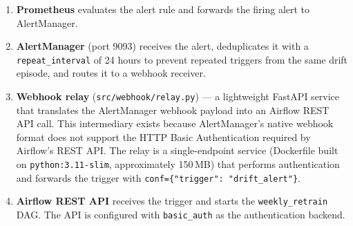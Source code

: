 \begin{enumerate}
    \item \textbf{Prometheus} evaluates the alert rule and forwards the
          firing alert to AlertManager.
    \item \textbf{AlertManager} (port 9093) receives the alert, deduplicates
          it with a \texttt{repeat\_interval} of 24 hours to prevent
          repeated triggers from the same drift episode, and routes it to
          a webhook receiver.
    \item \textbf{Webhook relay} (\texttt{src/webhook/relay.py}) --- a
          lightweight FastAPI service that translates the AlertManager
          webhook payload into an Airflow REST API call. This intermediary
          exists because AlertManager's native webhook format does not
          support the HTTP Basic Authentication required by Airflow's REST
          API. The relay is a single-endpoint service
          (Dockerfile built on \texttt{python:3.11-slim}, approximately
          150\,MB) that performs authentication and forwards the trigger
          with \texttt{conf=\{"trigger": "drift\_alert"\}}.
    \item \textbf{Airflow REST API} receives the trigger and starts the
          \texttt{weekly\_retrain} DAG. The API is configured with
          \texttt{basic\_auth} as the authentication backend.
\end{enumerate}
